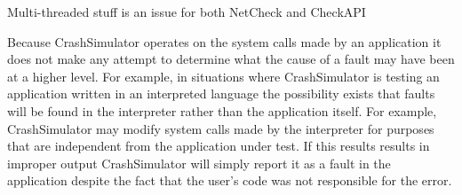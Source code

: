        Multi-threaded stuff is an issue for both NetCheck and CheckAPI

        Because CrashSimulator operates on the system calls made by an application it does not make any attempt to
        determine what the cause of a fault may have been at a higher level. For example, in situations where
        CrashSimulator is testing an application written in an interpreted language the possibility exists that faults
        will be found in the interpreter rather than the application itself. For example, CrashSimulator may modify
        system calls made by the interpreter for purposes that are independent from the application under test.  If this
        results results in improper output CrashSimulator will simply report it as a fault in the application despite
        the fact that the user's code was not responsible for the error.
